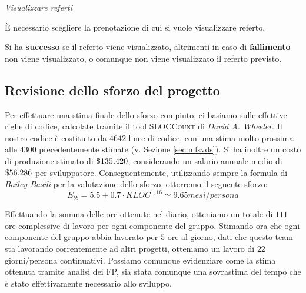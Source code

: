 \begin{description}
\begin{itemize}
                                                                                                                                   

\diam \textit{Visualizzare referti}

  
  È necessario scegliere la prenotazione di cui si vuole visualizzare referto.

  Si ha \textbf{successo} se il referto viene visualizzato, altrimenti in caso di
  \textbf{fallimento}  non viene visualizzato, o comunque non viene visualizzato il 
  referto previsto.
\end{itemize}
\end{description}

\subsection{Revisione dello sforzo del progetto}
Per effettuare una stima finale dello sforzo compiuto, ci basiamo sulle 
effettive righe di codice, calcolate tramite il tool \textsc{SLOCCount}
di \textit{David A. Wheeler}. Il nostro codice è costituito da $4642$ linee di codice,
con una stima molto prossima alle $4300$ precedentemente stimate (v. Sezione
\vref{sec:mfsvds}). Si ha inoltre un costo di produzione stimato di $\$ 135.420$,
considerando un salario annuale medio di $\$ 56.286$ per sviluppatore. 
Conseguentemente,  utilizzando sempre la formula di \textit{Bailey-Basili} per 
la valutazione dello sforzo, otterremo il seguente sforzo:
\[E_{bb} = 5.5 + 0.7 \cdot KLOC^{1,16}\simeq 9.65 mesi/persona\]

Effettuando la somma delle ore ottenute nel diario, otteniamo un totale di $111$ 
ore complessive di lavoro per ogni componente del gruppo. Stimando ora che ogni
componente del gruppo abbia lavorato per $5$ ore al giorno, dati che questo
team sta lavorando correntemente ad altri progetti, otteniamo un lavoro di $22$
giorni/persona continuativi. Possiamo comunque evidenziare come la stima ottenuta
tramite analisi dei FP, sia stata comunque una sovrastima del tempo che è stato
effettivamente necessario allo sviluppo. 


